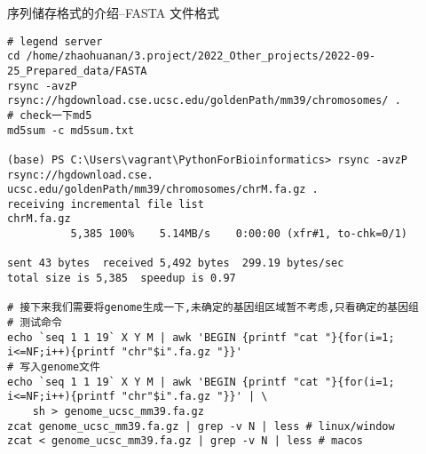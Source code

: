 \begin{frame}[fragile]{序列储存格式的介绍--FASTA 文件格式}
    \begin{lstlisting}
# legend server
cd /home/zhaohuanan/3.project/2022_Other_projects/2022-09-25_Prepared_data/FASTA
rsync -avzP rsync://hgdownload.cse.ucsc.edu/goldenPath/mm39/chromosomes/ .
# check一下md5
md5sum -c md5sum.txt

(base) PS C:\Users\vagrant\PythonForBioinformatics> rsync -avzP rsync://hgdownload.cse.
ucsc.edu/goldenPath/mm39/chromosomes/chrM.fa.gz .
receiving incremental file list
chrM.fa.gz
          5,385 100%    5.14MB/s    0:00:00 (xfr#1, to-chk=0/1)

sent 43 bytes  received 5,492 bytes  299.19 bytes/sec
total size is 5,385  speedup is 0.97

# 接下来我们需要将genome生成一下,未确定的基因组区域暂不考虑,只看确定的基因组
# 测试命令
echo `seq 1 1 19` X Y M | awk 'BEGIN {printf "cat "}{for(i=1; i<=NF;i++){printf "chr"$i".fa.gz "}}'
# 写入genome文件
echo `seq 1 1 19` X Y M | awk 'BEGIN {printf "cat "}{for(i=1; i<=NF;i++){printf "chr"$i".fa.gz "}}' | \
    sh > genome_ucsc_mm39.fa.gz
zcat genome_ucsc_mm39.fa.gz | grep -v N | less # linux/window
zcat < genome_ucsc_mm39.fa.gz | grep -v N | less # macos
    \end{lstlisting}
\end{frame}


